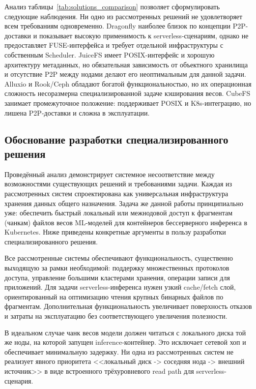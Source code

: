 Анализ таблицы~\ref{tab:solutions_comparison} позволяет сформулировать следующие наблюдения. Ни одно из рассмотренных решений не удовлетворяет всем требованиям одновременно. Dragonfly наиболее близок по концепции P2P-доставки и показывает высокую применимость к serverless-сценариям, однако не предоставляет FUSE-интерфейса и требует отдельной инфраструктуры с собственным Scheduler. JuiceFS имеет POSIX-интерфейс и хорошую архитектуру метаданных, но обязательная зависимость от объектного хранилища и отсутствие P2P между нодами делают его неоптимальным для данной задачи. Alluxio и Rook/Ceph обладают богатой функциональностью, но их операционная сложность несоразмерна специализированной задаче кэширования весов. CubeFS занимает промежуточное положение: поддерживает POSIX и K8s-интеграцию, но лишена P2P-доставки и сложна в эксплуатации.

\subsection{Обоснование разработки специализированного решения}
\label{sec:justification}

Проведённый анализ демонстрирует системное несоответствие между возможностями существующих решений и требованиями задачи. Каждая из рассмотренных систем спроектирована как универсальная инфраструктура хранения данных общего назначения. Задача же данной работы принципиально уже: обеспечить быстрый локальный или межнодовой доступ к фрагментам (чанкам) файлов весов ML-моделей для контейнеров бессерверного инференса в Kubernetes. Ниже приведены конкретные аргументы в пользу разработки специализированного решения.

 Все рассмотренные системы обеспечивают функциональность, существенно выходящую за рамки необходимой: поддержку множественных протоколов доступа, управление большими кластерами хранения, операции записи для приложений. Для задачи serverless-инференса нужен узкий cache/fetch слой, ориентированный на оптимизацию чтения крупных бинарных файлов по фрагментам. Дополнительная функциональность увеличивает поверхность отказов и затраты на эксплуатацию без соответствующего увеличения полезности.

 В идеальном случае чанк весов модели должен читаться с локального диска той же ноды, на которой запущен inference-контейнер. Это исключает сетевой хоп и обеспечивает минимальную задержку. Ни одна из рассмотренных систем не реализует явного приоритета <<локальный диск -> соседняя нода -> внешний источник>> в виде встроенного трёхуровневого read path для serverless-сценария.

